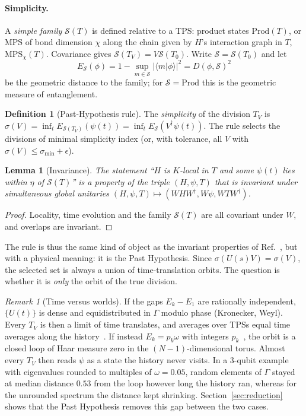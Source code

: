 \documentclass[11pt]{article}
\newtheorem{lemma}[theorem]{Lemma}
\theoremstyle{definition}
\newtheorem{definition}[theorem]{Definition}
\theoremstyle{remark}
\newtheorem{remark}[theorem]{Remark}
\newcommand{\braket}[2]{\langle #1|#2\rangle}
\newcommand{\Prod}{\mathrm{Prod}}
\newcommand{\MPS}{\mathrm{MPS}}
\begin{document}
\paragraph{Simplicity.} A \emph{simple family} $\mathcal{S}(T)$ is defined relative to a TPS: product states $\Prod(T)$, or MPS of bond dimension $\chi$ along the chain given by $H$'s interaction graph in $T$, $\MPS_\chi(T)$. Covariance gives $\mathcal{S}(T_V)=V\mathcal{S}(T_0)$. Write $\mathcal{S}=\mathcal{S}(T_0)$ and let
\[
E_{\mathcal S}(\phi)=1-\sup_{m\in\mathcal S}|\braket{m}{\phi}|^2=D(\phi,\mathcal S)^2
\]
be the geometric distance to the family; for $\mathcal{S}=\Prod$ this is the geometric measure of entanglement.

\begin{definition}[Past-Hypothesis rule]\label{def:rule}
The \emph{simplicity} of the division $T_V$ is $\sigma(V)=\inf_t E_{\mathcal S(T_V)}(\psi(t))=\inf_t E_{\mathcal S}(V^\dagger\psi(t))$. The rule selects the divisions of minimal simplicity index (or, with tolerance, all $V$ with $\sigma(V)\le\sigma_{\min}+\epsilon$).
\end{definition}

\begin{lemma}[Invariance]\label{lem:invariance}
The statement ``$H$ is $K$-local in $T$ and some $\psi(t)$ lies within $\eta$ of $\mathcal{S}(T)$'' is a property of the triple $(H,\psi,T)$ that is invariant under simultaneous global unitaries $(H,\psi,T)\mapsto(WHW^\dagger,W\psi,WTW^\dagger)$.
\end{lemma}
\begin{proof}
Locality, time evolution and the family $\mathcal S(T)$ are all covariant under $W$, and overlaps are invariant.
\end{proof}

The rule is thus the same kind of object as the invariant properties of Ref.~\cite{Soulas2025}, but with a physical meaning: it is the Past Hypothesis. Since $\sigma(U(s)V)=\sigma(V)$, the selected set is always a union of time-translation orbits. The question is whether it is \emph{only} the orbit of the true division.

\begin{remark}[Time versus worlds]\label{rem:time}
If the gaps $E_k-E_1$ are rationally independent, $\{U(t)\}$ is dense and equidistributed in $\Gamma$ modulo phase (Kronecker, Weyl). Every $T_V$ is then a limit of time translates, and averages over TPSs equal time averages along the history~\cite[Remark~11]{Stoica2022}. If instead $E_k=p_k\omega$ with integers $p_k$~\cite{CDD2026}, the orbit is a closed loop of Haar measure zero in the $(N-1)$-dimensional torus. Almost every $T_V$ then reads $\psi$ as a state the history never visits. In a 3-qubit example with eigenvalues rounded to multiples of $\omega=0.05$, random elements of $\Gamma$ stayed at median distance $0.53$ from the loop however long the history ran, whereas for the unrounded spectrum the distance kept shrinking. Section~\ref{sec:reduction} shows that the Past Hypothesis removes this gap between the two cases.
\end{remark}
\end{document}
